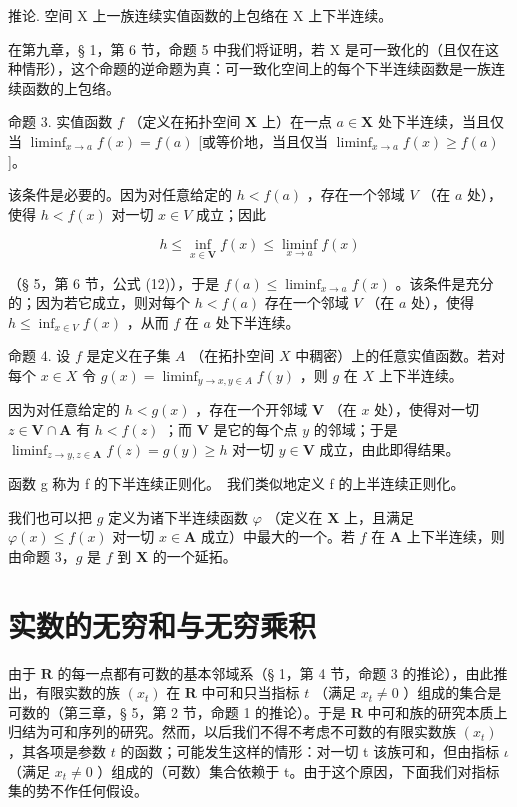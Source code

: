 推论. 空间 X 上一族连续实值函数的上包络在 X 上下半连续。

在第九章，§ 1，第 6 节，命题 5 中我们将证明，若 X 是可一致化的（且仅在这种情形），这个命题的逆命题为真：可一致化空间上的每个下半连续函数是一族连续函数的上包络。

命题 3. 实值函数 \(f\) （定义在拓扑空间 \(\mathbf{X}\) 上）在一点 \(a \in \mathbf{X}\) 处下半连续，当且仅当 \(\liminf_{x \to a} f(x) = f(a)\) {[}或等价地，当且仅当 \(\liminf_{x \to a} f(x) \geqslant f(a)\) {]}。

该条件是必要的。因为对任意给定的 \(h < f(a)\) ，存在一个邻域 \(V\) （在 \(a\) 处），使得 \(h < f(x)\) 对一切 \(x \in V\) 成立；因此

\[
h \leqslant \inf _ {x \in \mathbf {V}} f (x) \leqslant \liminf _ {x \rightarrow a} f (x)
\]

（§ 5，第 6 节，公式 (12)），于是 \(f(a) \leqslant \liminf_{x \to a} f(x)\) 。该条件是充分的；因为若它成立，则对每个 \(h < f(a)\) 存在一个邻域 \(V\) （在 \(a\) 处），使得 \(h \leqslant \inf_{x \in V} f(x)\) ，从而 \(f\) 在 \(a\) 处下半连续。

命题 4. 设 \(f\) 是定义在子集 \(A\) （在拓扑空间 \(X\) 中稠密）上的任意实值函数。若对每个 \(x \in X\) 令 \(g(x) = \liminf_{y \to x, y \in A} f(y)\) ，则 \(g\) 在 \(X\) 上下半连续。

因为对任意给定的 \(h < g(x)\) ，存在一个开邻域 \(\mathbf{V}\) （在 \(x\) 处），使得对一切 \(z \in \mathbf{V} \cap \mathbf{A}\) 有 \(h < f(z)\) ；而 \(\mathbf{V}\) 是它的每个点 \(y\) 的邻域；于是 \(\liminf_{z \to y, z \in \mathbf{A}} f(z) = g(y) \geqslant h\) 对一切 \(y \in \mathbf{V}\) 成立，由此即得结果。

函数 g 称为 f 的下半连续正则化。~我们类似地定义 f 的上半连续正则化。

我们也可以把 \(g\) 定义为诸下半连续函数 \(\varphi\) （定义在 \(\mathbf{X}\) 上，且满足 \(\varphi(x) \leqslant f(x)\) 对一切 \(x \in \mathbf{A}\) 成立）中最大的一个。若 \(f\) 在 \(\mathbf{A}\) 上下半连续，则由命题 3，\(g\) 是 \(f\) 到 \(\mathbf{X}\) 的一个延拓。

\section{实数的无穷和与无穷乘积}

由于 \(\mathbf{R}\) 的每一点都有可数的基本邻域系（§ 1，第 4 节，命题 3 的推论），由此推出，有限实数的族 \((x_{t})\) 在 \(\mathbf{R}\) 中可和只当指标 \(t\) （满足 \(x_{t} \neq 0\) ）组成的集合是可数的（第三章，§ 5，第 2 节，命题 1 的推论）。于是 \(\mathbf{R}\) 中可和族的研究本质上归结为可和序列的研究。然而，以后我们不得不考虑不可数的有限实数族 \((x_{t})\) ，其各项是参数 \(t\) 的函数；可能发生这样的情形：对一切 t 该族可和，但由指标 \(\iota\) （满足 \(x_{t} \neq 0\) ）组成的（可数）集合依赖于 t。由于这个原因，下面我们对指标集的势不作任何假设。

